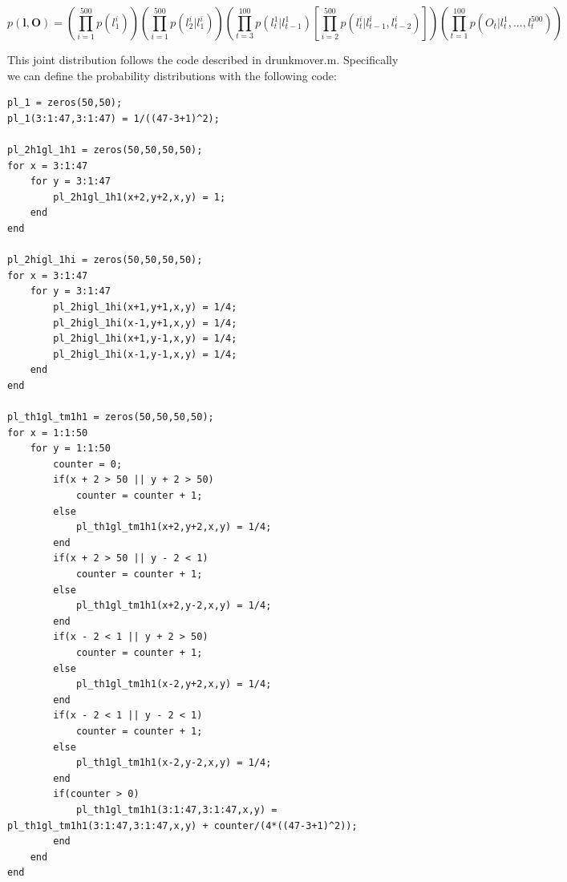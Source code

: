 \documentclass[11pt,a4paper,oneside]{report}
\begin{document}
	$$p(\mathbf{l,O})=\left( \prod_{i=1}^{500}p(l_1^i) \right) \left( \prod_{i=1}^{500}p(l_2^i|l_1^i) \right) \left( \prod_{t=3}^{100} p(l_t^1|l_{t-1}^1) \left[ \prod_{i=2}^{500}p(l_t^i|l_{t-1}^i,l_{t-2}^i) \right] \right) \left( \prod_{t=1}^{100}p(O_t|l_t^1,...,l_t^{500}) \right)$$
	
	This joint distribution follows the code described in drunkmover.m. Specifically we can define the probability distributions with the following code:

\begin{lstlisting}
pl_1 = zeros(50,50);
pl_1(3:1:47,3:1:47) = 1/((47-3+1)^2);

pl_2h1gl_1h1 = zeros(50,50,50,50);
for x = 3:1:47
    for y = 3:1:47
        pl_2h1gl_1h1(x+2,y+2,x,y) = 1;
    end
end

pl_2higl_1hi = zeros(50,50,50,50);
for x = 3:1:47
    for y = 3:1:47
        pl_2higl_1hi(x+1,y+1,x,y) = 1/4;
        pl_2higl_1hi(x-1,y+1,x,y) = 1/4;
        pl_2higl_1hi(x+1,y-1,x,y) = 1/4;
        pl_2higl_1hi(x-1,y-1,x,y) = 1/4;
    end
end

pl_th1gl_tm1h1 = zeros(50,50,50,50);
for x = 1:1:50
    for y = 1:1:50
        counter = 0;
        if(x + 2 > 50 || y + 2 > 50)
            counter = counter + 1;
        else
            pl_th1gl_tm1h1(x+2,y+2,x,y) = 1/4;
        end
        if(x + 2 > 50 || y - 2 < 1)
            counter = counter + 1;
        else
            pl_th1gl_tm1h1(x+2,y-2,x,y) = 1/4;
        end
        if(x - 2 < 1 || y + 2 > 50)
            counter = counter + 1;
        else
            pl_th1gl_tm1h1(x-2,y+2,x,y) = 1/4;
        end
        if(x - 2 < 1 || y - 2 < 1)
            counter = counter + 1;
        else
            pl_th1gl_tm1h1(x-2,y-2,x,y) = 1/4;
        end
        if(counter > 0)
            pl_th1gl_tm1h1(3:1:47,3:1:47,x,y) = pl_th1gl_tm1h1(3:1:47,3:1:47,x,y) + counter/(4*((47-3+1)^2));
        end
    end
end


\end{lstlisting}
\end{document}
